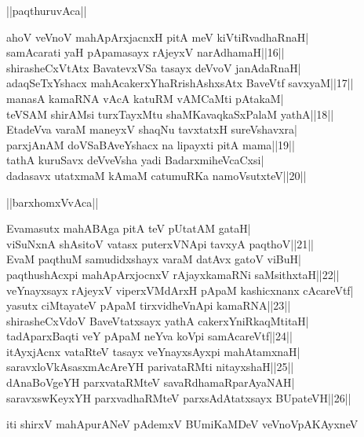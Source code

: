 \documentclass{article}
\begin{document}
\begin{center}
||paqthuruvAca||
\end{center}

ahoV veVnoV mahApArxjacnxH pitA meV kiVtiRvadhaRnaH|\\
samAcarati yaH pApamasayx rAjeyxV narAdhamaH||16||\\
shirasheCxVtAtx BavatevxVSa tasayx deVvoV janAdaRnaH|\\
adaqSeTxYshacx mahAcakerxYhaRrishAshxsAtx BaveVtf savxyaM||17||\\
manasA kamaRNA vAcA katuRM vAMCaMti pAtakaM|\\
teVSAM shirAMsi turxTayxMtu shaMKavaqkaSxPalaM yathA||18||\\
EtadeVva varaM maneyxV shaqNu tavxtatxH sureVshavxra|\\
parxjAnAM doVSaBAveYshacx na lipayxti pitA mama||19||\\
tathA kuruSavx deVveVsha yadi BadarxmiheVcaCxsi|\\
dadasavx utatxmaM kAmaM catumuRKa namoVsutxteV||20||\\

\begin{center}
||barxhomxVvAca||
\end{center}

Evamasutx mahABAga pitA teV pUtatAM gataH|\\
viSuNxnA shAsitoV vatasx puterxVNApi tavxyA paqthoV||21||\\
EvaM paqthuM samudidxshayx varaM datAvx gatoV viBuH|\\
paqthushAcxpi mahApArxjocnxV rAjayxkamaRNi saMsithxtaH||22||\\
veYnayxsayx rAjeyxV viperxVMdArxH pApaM kashicxnanx cAcareVtf|\\
yasutx ciMtayateV pApaM tirxvidheVnApi kamaRNA||23||\\
shirasheCxVdoV BaveVtatxsayx yathA cakerxYniRkaqMtitaH|\\
tadAparxBaqti veY pApaM neYva koVpi samAcareVtf||24||\\
itAyxjAcnx vataRteV tasayx veYnayxsAyxpi mahAtamxnaH|\\
saravxloVkAsasxmAcAreYH parivataRMti nitayxshaH||25||\\
dAnaBoVgeYH parxvataRMteV savaRdhamaRparAyaNAH|\\
saravxswKeyxYH parxvadhaRMteV parxsAdAtatxsayx BUpateVH||26||

\begin{center}
iti shirxV mahApurANeV pAdemxV BUmiKaMDeV veVnoVpAKAyxneV
\end{center}
\end{document}
